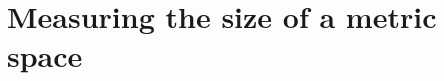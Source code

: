 \documentclass[thesis.tex]{subfiles}
\newcommand{\aspect}[1]{\Delta_{#1}}
\newcommand{\cexp}{c_\textnormal{exp}}
\newcommand{\cdoub}{c_\textnormal{doub}}
\begin{document}

%



\section{Measuring the size of a metric space}
\label{sec:measure}
\end{document}
